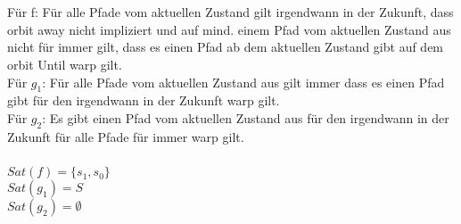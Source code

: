 \documentclass[a4paper,12pt]{scrartcl}
\title{\blatt}
\date{Gruppe 06}
\author{Sabrina Buczko 6663234, Julian Deinert 6535880, Rafael Heid 6704828}
\begin{document}
\maketitle
\newpage
\setcounter{section}{4}
\section{}
\setcounter{subsection}{2}
\subsection{}
\subsubsection{}

\subsubsection{}
Für f: Für alle Pfade vom aktuellen Zustand gilt irgendwann in der Zukunft, dass orbit away nicht impliziert und auf mind. einem Pfad vom aktuellen Zustand aus nicht für immer gilt, dass es einen Pfad ab dem aktuellen Zustand gibt auf dem orbit Until warp gilt.\\
Für $g_1$: Für alle Pfade vom aktuellen Zustand aus gilt immer dass es einen Pfad gibt für den irgendwann in der Zukunft warp gilt.\\
Für $g_2$: Es gibt einen Pfad vom aktuellen Zustand aus für den irgendwann in der Zukunft für alle Pfade für immer warp gilt.

\subsubsection{}
$Sat(f)= \{s_1, s_0\}$\\
$Sat(g_1)= S$\\
$Sat(g_2)= \emptyset$
\subsubsection{}

\subsection{}
\subsection{}
\end{document}
